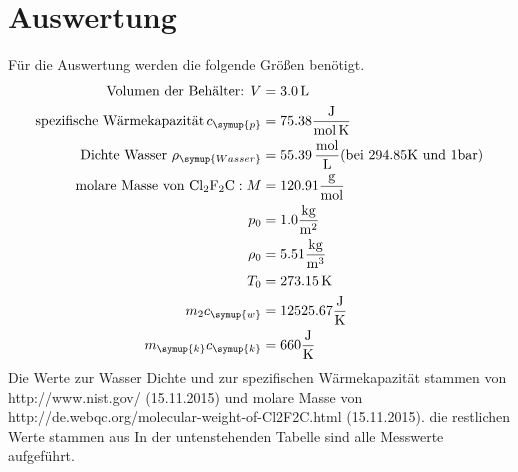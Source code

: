 \section{Auswertung}
\label{sec:Auswertung}
Für die Auswertung werden die folgende Größen benötigt.
\begin{align*}
  \text{Volumen der Behälter: } V &= 3.0 \,\si{\liter} \\
  \text{spezifische Wärmekapazität}\, c_\symup{p} &= 75.38\si{\frac{\joule}{\mol\,\kelvin}}  \\
  \text{Dichte Wasser } \rho_\symup{Wasser} &= 55.39 \,\si{\frac{\mol}{\liter}}
        (\text{bei } 294.85 \si{\kelvin} \text{ und } 1\si{\bar}) \\
  \text{molare Masse von } \ce{Cl2F2C}: M &= 120.91 \si{\frac{\gram}{\mol}} \\
  p_0 &= 1.0 \si{\frac{\kilo\gram}{\meter^2}}  \\
  \rho_0 &= 5.51  \si{\frac{\kilo\gram}{\meter^3}} \\
  T_0 &= 273.15 \,  \si{\kelvin}  \\
  m_2c_\symup{w} &= 12525.67 \si{\frac{\joule}{\kelvin}} \\
  m_\symup{k}c_\symup{k} &= 660   \si{\frac{\joule}{\kelvin}}
\end{align*}
Die Werte zur Wasser Dichte und zur spezifischen Wärmekapazität stammen von
http://www.nist.gov/ (15.11.2015) und molare Masse von http://de.webqc.org/molecular-weight-of-Cl2F2C.html (15.11.2015).
die restlichen Werte stammen aus \cite{sample}
In der untenstehenden Tabelle sind alle Messwerte aufgeführt.
